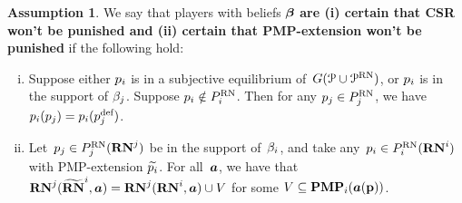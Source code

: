 \documentclass[sigconf]{aamas}
\newcommand{\allprogreneg}{\allprog^{\text{RN}}}
\theoremstyle{definition}
\newtheorem{assumption}[definition]{Assumption}
\begin{document}
\begin{assumption}
     We say that 
     players 
     with beliefs $\boldsymbol{\beta}$ 
     \textbf{are (i) certain that CSR won't be punished and (ii) certain that PMP-extension won't be punished} 
     if the following hold:
     \begin{enumerate}[(i)]
      \item Suppose either $p_i$ is in a subjective equilibrium
     of~$\game(\allprog \cup \allprogreneg)$,
     or $p_i$ is in the support of $\beta_j$.
      Suppose $p_i \notin P_i^{\textnormal{RN}}$. 
         Then for any $p_j \in  P_j^{\textnormal{RN}}$,
         we have 
         $p_i(p_j) = p_i(p_j^{\textnormal{def}})$.
         \label{subassum:csrwlog}
         \item Let~$p_j \in P_j^{\textnormal{RN}}(\mathbf{RN}^{j})$ be in the
     support of~$\beta_i$,
     and take any~$p_i \in P_i^{\textnormal{RN}}(\mathbf{RN}^{i})$
     with PMP-extension $\widetilde{p_i}$.
         For all~$\boldsymbol{a}$, we have that
     $\mathbf{RN}^{j}({\widetilde{\mathbf{RN}}}^{i},\boldsymbol{a}) = \mathbf{RN}^{j}(\mathbf{RN}^{i},\boldsymbol{a}) \cup 
     {V}$ for some ${V} \subseteq \mathbf{PMP}_i(\boldsymbol{a}(\textbf{p}))$. \label{subassum:extension}
     \end{enumerate}
     
      \label{assum:nopunish}
\end{assumption}  %
\end{document}
